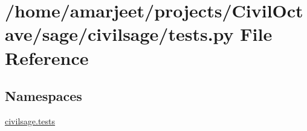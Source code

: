 \hypertarget{a00014}{}\section{/home/amarjeet/projects/\+Civil\+Octave/sage/civilsage/tests.py File Reference}
\label{a00014}
\subsection*{Namespaces}
\begin{DoxyCompactItemize}
\item 
 \hyperlink{a00034}{civilsage.\+tests}
\end{DoxyCompactItemize}
